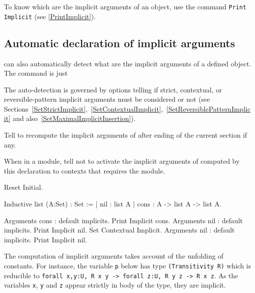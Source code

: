 \Rem To know which are the implicit arguments of an object, use the command
{\tt Print Implicit} (see \ref{PrintImplicit}).

\subsection{Automatic declaration of implicit arguments}

{\Coq} can also automatically detect what are the implicit arguments
of a defined object. The command is just
\begin{quote}
{}
\end{quote}
The auto-detection is governed by options telling if strict,
contextual, or reversible-pattern implicit arguments must be
considered or not (see
Sections~\ref{SetStrictImplicit},~\ref{SetContextualImplicit},~\ref{SetReversiblePatternImplicit}
and also~\ref{SetMaximalImplicitInsertion}).

\begin{Variants}
\item {}

Tell to recompute the implicit arguments of {\qualid} after ending of
the current section if any.

\item {}

When in a module, tell not to activate the implicit arguments of
{\qualid} computed by this declaration to contexts that requires the
module.

\end{Variants}

\Example
\begin{coq_eval}
Reset Initial.
\end{coq_eval}
\begin{coq_example*}
Inductive list (A:Set) : Set := 
  | nil : list A 
  | cons : A -> list A -> list A.
\end{coq_example*}
\begin{coq_example}
Arguments cons : default implicits.
Print Implicit cons.
Arguments nil : default implicits.
Print Implicit nil.
Set Contextual Implicit.
Arguments nil : default implicits.
Print Implicit nil.
\end{coq_example}

The computation of implicit arguments takes account of the
unfolding of constants.  For instance, the variable {\tt p} below has
type {\tt (Transitivity R)} which is reducible to {\tt forall x,y:U, R x
y -> forall z:U, R y z -> R x z}. As the variables {\tt x}, {\tt y} and
{\tt z} appear strictly in body of the type, they are implicit.

